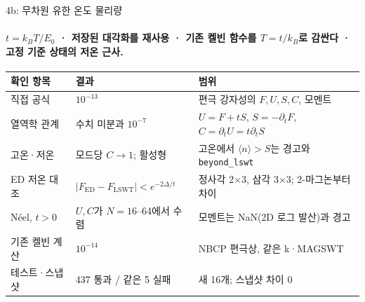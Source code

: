 \begin{frame}[label=stage4b-thermal]{4b: 무차원 유한 온도 물리량}
  \framesubtitle{$t=k_BT/E_0$ · 저장된 대각화를 재사용 · 기존 켈빈 함수를 $T=t/k_B$로 감싼다 · 고정 기준 상태의 저온 근사.}
  \footnotesize\renewcommand{\arraystretch}{1.08}
  \begin{tabularx}{\textwidth}{@{}P{3.3cm}P{3.4cm}Y@{}}
    \toprule
    확인 항목 & 결과 & 범위 \\
    \midrule
    직접 공식 & $10^{-13}$ & 편극 강자성의 $F,U,S,C$, 모멘트 \\
    열역학 관계 & 수치 미분과 $10^{-7}$ & $U=F+tS$, $S=-\partial_tF$, $C=\partial_tU=t\partial_tS$ \\
    고온·저온 & 모드당 $C\to1$; 활성형 & 고온에서 $\langle n\rangle>S$는 경고와 \texttt{beyond\_lswt} \\
    ED 저온 대조 & $|F_{\mathrm{ED}}-F_{\mathrm{LSWT}}|<e^{-2\Delta/t}$ & 정사각 2$\times$3, 삼각 3$\times$3; 2-마그논부터 차이 \\
    Néel, $t>0$ & $U,C$가 $N=16$--64에서 수렴 & 모멘트는 NaN(2D 로그 발산)과 경고 \\
    기존 켈빈 계산 & $10^{-14}$ & NBCP 편극상, 같은 k·MAGSWT \\
    테스트·스냅샷 & 437 통과 / 같은 5 실패 & 새 16개; 스냅샷 차이 0 \\
    \bottomrule
  \end{tabularx}
  \par\medskip
\end{frame}

